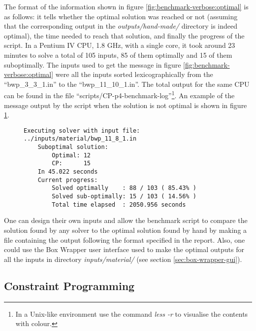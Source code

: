 The format of the information shown in figure \ref{fig:benchmark-verbose:optimal}
is as follows: it tells whether the optimal solution was reached or not (assuming
that the corresponding output in the \textit{outputs/hand-made/} directory is indeed
optimal), the time needed to reach that solution, and finally the progress of the
script. In a Pentium IV CPU, 1.8 GHz, with a single core, it took around 23 minutes
to solve a total of 105 inputs, 85 of them optimally and 15 of them suboptimally.
The inputs used to get the message in figure \ref{fig:benchmark-verbose:optimal} were
all the inputs sorted lexicographically from the ``bwp\_3\_3\_1.in'' to the
``bwp\_11\_10\_1.in''. The total output for the same CPU can be found
in the file ``scripts/CP-p4-benchmark-log''\footnote{ In a Unix-like environment use
the command \textit{less -r} to visualise the contents with colour.}.
An example of the message output by the script when the solution is not optimal is
shown in figure \ref{fig:benchmark-verbose:suboptimal}.

\begin{figure}[H]
\centering
{\scriptsize
\begin{BVerbatim}
Executing solver with input file: ../inputs/material/bwp_11_8_1.in
    Suboptimal solution:
        Optimal: 12
        CP:      15
    In 45.022 seconds
    Current progress:
        Solved optimally    : 88 / 103 ( 85.43%
        Solved sub-optimally: 15 / 103 ( 14.56%
        Total time elapsed  : 2050.956 seconds
\end{BVerbatim}
}
\label{fig:benchmark-verbose:suboptimal}
\end{figure}

\hfill

One can design their own inputs and allow the benchmark script to compare
the solution found by any solver to the optimal solution found by hand by
making a file containing the output following the format specified in the
report. Also, one could use the Box Wrapper user interface used to make the
optimal outputs for all the inputs in directory \textit{inputs/material/}
(see section \ref{sec:box-wrapper-gui}).

\subsection{Constraint Programming}
\label{sec:benchmarking:constraint-programming}

